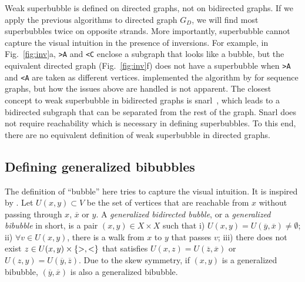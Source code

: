 \documentclass[webpdf,contemporary,large,namedate]{oup-authoring-template}%
\begin{document}
Weak superbubble is defined on directed graphs, not on bidirected graphs.
If we apply the previous algorithms to directed graph $G_D$,
we will find most superbubbles twice on opposite strands.
More importantly, superbubble cannot capture the visual intuition in the presence of inversions.
For example, in Fig.~\ref{fig:inv}a, {\tt >A} and {\tt <C} enclose a subgraph that looks like a bubble,
but the equivalent directed graph (Fig.~\ref{fig:inv}f) does not have a superbubble when {\tt >A} and {\tt <A} are taken as different vertices.
\citet{Dabbaghie:2022aa} implemented the algorithm by \citet{DBLP:conf/wabi/OnoderaSS13} for sequence graphs,
but how the issues above are handled is not apparent.
The closest concept to weak superbubble in bidirected graphs is snarl~\citep{Paten:2018aa},
which leads to a bidirected subgraph that can be separated from the rest of the graph.
Snarl does not require reachability which is necessary in defining superbubbles.
To this end, there are no equivalent definition of weak superbubble in directed graphs.

\subsection{Defining generalized bibubbles}


The definition of ``bubble'' here tries to capture the visual intuition.
It is inspired by \citet{DBLP:conf/wabi/OnoderaSS13}.
Let $U(x,y)\subset V$ be the set of vertices that are reachable from $x$ without passing through $x$, $\overline{x}$ or $y$.
A \emph{generalized bidirected bubble}, or a \emph{generalized bibubble} in short, is a pair $(x,y)\in X\times X$ such that
i) $U(x,y)=U(\overline{y},\overline{x})\not=\emptyset$;
ii) $\forall v\in U(x,y)$, there is a walk from $x$ to $y$ that passes $v$;
iii) there does not exist $z\in U(x,y)\times\{{\rm >},{\rm <}\}$
that satisfies $U(x,z)=U(\overline{z},\overline{x})$ or $U(z,y)=U(\overline{y},\overline{z})$.
Due to the skew symmetry, if $(x,y)$ is a generalized bibubble, $(\overline{y},\overline{x})$ is also a generalized bibubble.
\end{document}
